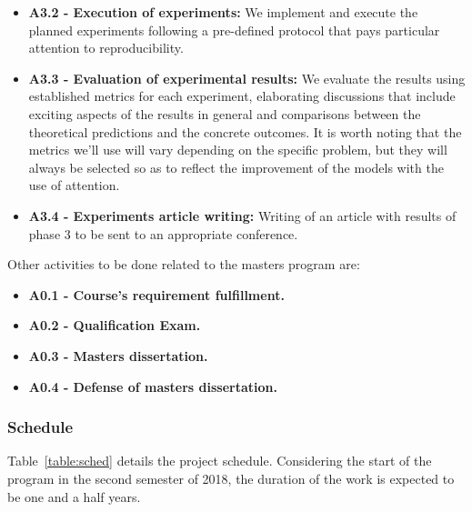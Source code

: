 \documentclass[12pt]{article}
\begin{document}
\begin{itemize}
    \item \textbf{A3.2 - Execution of experiments:}
        We implement and execute the planned experiments following a pre-defined protocol that
        pays particular attention to reproducibility.

    \item \textbf{A3.3 - Evaluation of experimental results:}
        We evaluate the results using established metrics for each experiment,
        elaborating discussions that include exciting aspects of the results in general and
        comparisons between the theoretical predictions and the concrete outcomes.
        It is worth noting that the metrics we'll use will vary depending on the specific problem,
        but they will always be selected so as to reflect the improvement of the models with the use of
        attention.

    \item \textbf{A3.4 - Experiments article writing:}
        Writing of an article with results of phase $3$ to be sent to an appropriate conference.
\end{itemize}

Other activities to be done related to the masters program are:
\begin{itemize}
    \item \textbf{A0.1 - Course's requirement fulfillment.}
    \item \textbf{A0.2 - Qualification Exam.}
    \item \textbf{A0.3 - Masters dissertation.}
    \item \textbf{A0.4 - Defense of masters dissertation.}
\end{itemize}

\subsubsection{Schedule}
Table~\ref{table:sched} details the project schedule.
Considering the start of the program in the second semester of 2018, the duration of the work is expected to be
one and a half years.
\end{document}
